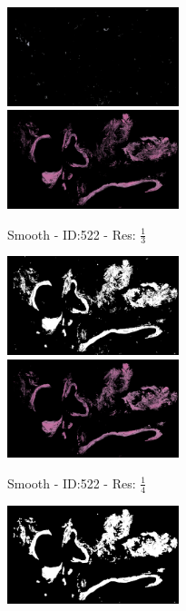 \documentclass[letterpaper,10pt,oneside]{article}
\begin{document}
\begin{figure}[hbtp]
\begin{subfigure}[b]{5cm}
    \includegraphics[width=5cm]{visualization/results/smoothhistogram/res_reduce_3/Region_1_PO13-00522A1_1_2_201305171639.png}
    \includegraphics[width=5cm]{visualization/results/smoothhistogram/res_reduce_3/Region_2_PO13-00522A1_1_2_201305171639.png}
    \caption{Smooth - ID:522 - Res: $\frac{1}{3}$}
  \end{subfigure}
  \begin{subfigure}[b]{5cm}
    \includegraphics[width=5cm]{visualization/results/smoothhistogram/res_reduce_4/Region_0_PO13-00522A1_1_2_201305171639.png}
    \includegraphics[width=5cm]{visualization/results/smoothhistogram/res_reduce_4/Region_1_PO13-00522A1_1_2_201305171639.png}
    \caption{Smooth - ID:522 - Res: $\frac{1}{4}$}
  \end{subfigure}
  \begin{subfigure}[b]{5cm}
    \includegraphics[width=5cm]{visualization/results/smoothhistogram/res_reduce_5/Region_0_PO13-00522A1_1_2_201305171639.png}

\end{subfigure}
\end{figure}
\end{document}
